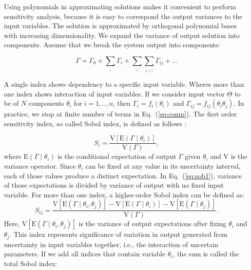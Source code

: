 Using polynomials in approximating solutions makes it convenient to perform
sensitivity analysis, because it is easy to correspond the output variances to
the input variables. The solution is approximated by orthogonal polynomial bases
with increasing dimensionality. We expand the variance of output solution into
components. Assume that we break the system output into components:

\begin{equation}
\Gamma=\Gamma_{0}+\underset{_{i}}{\sum}\Gamma_{i}+\underset{_{i}}{\sum}\underset
{_{j>i}}{\sum}\Gamma_{ij}+...\label{eq:comp}\end{equation}

A single index shows dependency to a specific input variable. Wheres more than
one index shows interaction of input variables. If we consider input vector
$\Theta$ to be of $N$ components $\theta_{i}$ for $i=1,..,n$, then
$\Gamma_{i}=f_{i}(\theta_{i})$ and $\Gamma_{ij}=f_{ij}(\theta_{i}\theta_{j})$.
In practice, we stop at finite number of terms in Eq.~(\ref{eq:comp}).
 The first order sensitivity index, so called Sobol index, is defined as follows
\cite{saltelli2007global}:

\begin{equation}
S_{i}=\frac{\mbox{V}[\mbox{E}(\Gamma\mid\theta_{i})]}{\mbox{V}(\Gamma)},\label{
eq:sob1}\end{equation} where $\mbox{E}(\Gamma\mid\theta_{i})$ is the conditional
expectation of output $\Gamma$ given $\theta_{i}$ and $\mbox{V}$ is the variance
operator. Since $\theta_{i}$ can be fixed at any value in its uncertainty
interval, each of those values produce a distinct expectation. In
Eq.~(\ref{eq:sob1}), variance of those expectations is divided by variance of
output with no fixed input variable. For more than one index, a higher-order
Sobol index can be defined as:\begin{equation}
S_{ij}=\frac{\mbox{V}[\mbox{E}(\Gamma\mid\theta_{i},\theta_{j})]-\mbox{V}[\mbox{
E}(\Gamma\mid\theta_{i})]-\mbox{V}[\mbox{E}(\Gamma\mid\theta_{j})]}{\mbox{V}
(\Gamma)}.\label{eq:sob2}\end{equation} Here,
$\mbox{V}[\mbox{E}(\Gamma\mid\theta_{i},\theta_{j})]$ is the variance of output
expectations after fixing $\theta_{i}$ and $\theta_{j}$. This index represents
significance of variation in output generated from uncertainty in input 
variables together, i.e., the interaction of uncertain parameters. If we add all
indices that contain variable $\theta_{i}$, the sum is called the total Sobol
index:

